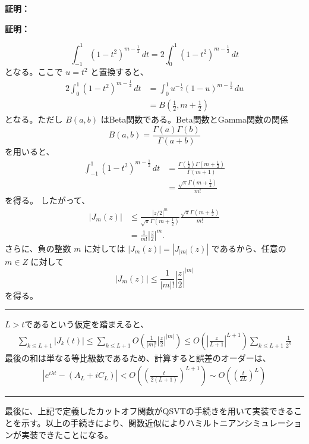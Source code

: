 \documentclass[a4paper,10.5pt]{article}
\numberwithin{equation}{section}
\newenvironment{proofbox}
{\begin{prooflabel}\textbf{証明：}\end{prooflabel}\vspace{0.8em}}
{\par\vspace{1em}\hrule\vspace{1em}}
\begin{document}
\begin{proofbox}
\begin{proofbox}
\begin{enumerate}
\begin{equation}
\int_{-1}^{1}(1-t^2)^{m-\frac{1}{2}}\,dt=2\int_{0}^{1}(1-t^2)^{m-\frac{1}{2}}\,dt
\end{equation}
となる。ここで $u=t^2$ と置換すると、
\begin{align}
2\int_{0}^{1}(1-t^2)^{m-\frac{1}{2}}\,dt
&=\int_{0}^{1}u^{-\frac{1}{2}}(1-u)^{m-\frac{1}{2}}\,du \\
&=B\left(\frac{1}{2},m+\frac{1}{2}\right)
\end{align}
となる。ただし $B(a,b)$ はBeta関数である。Beta関数とGamma関数の関係
\begin{equation}
B(a,b)=\frac{\Gamma(a)\Gamma(b)}{\Gamma(a+b)}
\end{equation}
を用いると、
\begin{align}
\int_{-1}^{1}(1-t^2)^{m-\frac{1}{2}}\,dt
&=\frac{\Gamma\left(\frac{1}{2}\right)\Gamma\left(m+\frac{1}{2}\right)}{\Gamma(m+1)} \\
&=\frac{\sqrt{\pi}\Gamma\left(m+\frac{1}{2}\right)}{m!}
\end{align}
を得る。
したがって、
\begin{align}
|J_m(z)|
&\leq\frac{|z/2|^m}{\sqrt{\pi}\Gamma\left(m+\frac{1}{2}\right)}
\frac{\sqrt{\pi}\Gamma\left(m+\frac{1}{2}\right)}{m!} \\
&=\frac{1}{m!}\left|\frac{z}{2}\right|^m.
\end{align}
さらに、負の整数 $m$ に対しては $|J_m(z)|=|J_{|m|}(z)|$ であるから、任意の $m\in Z$ に対して
\begin{equation}
\boxed{|J_m(z)|\leq\frac{1}{|m|!}\left|\frac{z}{2}\right|^{|m|}}
\end{equation}
を得る。
\end{enumerate}
\end{proofbox}
    $L>t$であるという仮定を踏まえると、
    \begin{align*}
        \sum_{k\leq L+1}|J_{k}(t)|\leq\sum_{k\leq L+1}O(\frac{1}{|m|!}\left|\frac{z}{2}\right|^{|m|})\leq O(|\frac{z}{L+1}|^{L+1})\sum_{k\leq L+1}\frac{1}{2^{k}}
    \end{align*}
    最後の和は単なる等比級数であるため、計算すると誤差のオーダーは、
    \begin{align*}
        |e^{i\lambda t}-(A_{L}+iC_{L})|<O((\frac{t}{2(L+1)})^{L+1})\sim O((\frac{t}{2L})^{L})
    \end{align*}
\end{proofbox}
最後に、上記で定義したカットオフ関数がQSVTの手続きを用いて実装できることを示す。以上の手続きにより、関数近似によりハミルトニアンシミュレーションが実装できたことになる。\\
\end{document}
